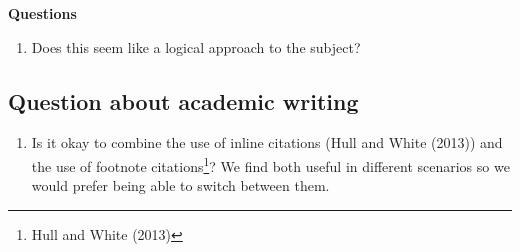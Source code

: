 \documentclass[10pt,a4paper]{article}
\begin{document}
        \textbf{Questions}
        \begin{enumerate}
            \item Does this seem like a logical approach to the subject?
        \end{enumerate}

    \subsection{Question about academic writing}
        \begin{enumerate}
            \item Is it okay to combine the use of inline citations (Hull and White (2013)) and the use of footnote citations\footnote{Hull and White (2013)}? We find both useful in different scenarios so we would prefer being able to switch between them.
        \end{enumerate}
\end{document}
